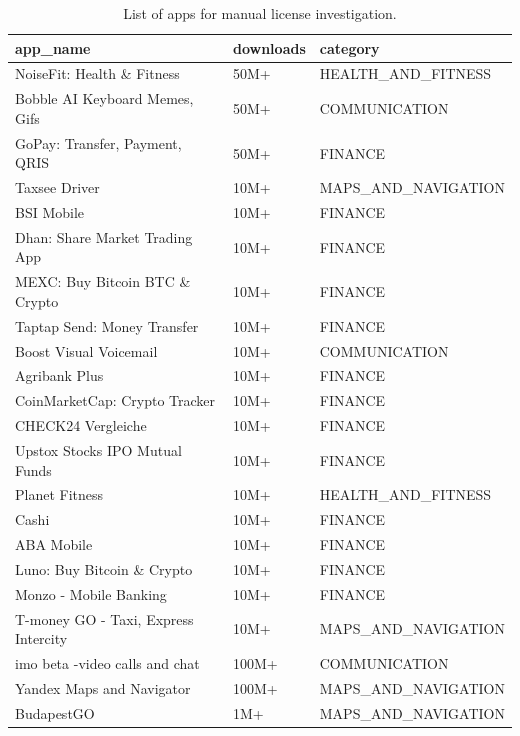 \documentclass[12pt,a4paper]{report}
\begin{document}
\begin{table}[!ht]
    \centering
    \caption{List of apps for manual license investigation.}
    \label{tab:list-apps-manual-validation}
    \begin{tabular}{|l|l|l|}
    \hline
        \textbf{app\_name} & \textbf{downloads} & \textbf{category} \\ \hline
        NoiseFit: Health \& Fitness & 50M+ & HEALTH\_AND\_FITNESS \\ \hline
        Bobble AI Keyboard Memes, Gifs & 50M+ & COMMUNICATION \\ \hline
        GoPay: Transfer, Payment, QRIS & 50M+ & FINANCE \\ \hline
        Taxsee Driver & 10M+ & MAPS\_AND\_NAVIGATION \\ \hline
        BSI Mobile & 10M+ & FINANCE \\ \hline
        Dhan: Share Market Trading App & 10M+ & FINANCE \\ \hline
        MEXC: Buy Bitcoin BTC \& Crypto & 10M+ & FINANCE \\ \hline
        Taptap Send: Money Transfer & 10M+ & FINANCE \\ \hline
        Boost Visual Voicemail & 10M+ & COMMUNICATION \\ \hline
        Agribank Plus & 10M+ & FINANCE \\ \hline
        CoinMarketCap: Crypto Tracker & 10M+ & FINANCE \\ \hline
        CHECK24 Vergleiche & 10M+ & FINANCE \\ \hline
        Upstox Stocks IPO Mutual Funds & 10M+ & FINANCE \\ \hline
        Planet Fitness & 10M+ & HEALTH\_AND\_FITNESS \\ \hline
        Cashi & 10M+ & FINANCE \\ \hline
        ABA Mobile & 10M+ & FINANCE \\ \hline
        Luno: Buy Bitcoin \& Crypto & 10M+ & FINANCE \\ \hline
        Monzo - Mobile Banking & 10M+ & FINANCE \\ \hline
        T-money GO - Taxi, Express Intercity & 10M+ & MAPS\_AND\_NAVIGATION \\ \hline
        imo beta -video calls and chat & 100M+ & COMMUNICATION \\ \hline
        Yandex Maps and Navigator & 100M+ & MAPS\_AND\_NAVIGATION \\ \hline
        BudapestGO & 1M+ & MAPS\_AND\_NAVIGATION \\ \hline

\end{tabular}
\end{table}
\end{document}
